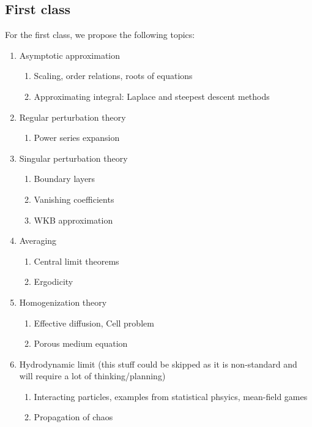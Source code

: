 \documentclass[12pt]{amsart}
\begin{document}
\subsection{First class}
For the first class, we propose the following topics:
\begin{enumerate}
    \item Asymptotic approximation 
        \begin{enumerate}
            \item Scaling, order relations, roots of equations
            \item Approximating integral: Laplace and steepest descent methods
        \end{enumerate}
    \item Regular perturbation theory
        \begin{enumerate}
            \item Power series expansion
        \end{enumerate}
    \item Singular perturbation theory
        \begin{enumerate}
            \item Boundary layers
            \item Vanishing coefficients 
            \item WKB approximation
        \end{enumerate}
    \item Averaging
        \begin{enumerate}
            \item Central limit theorems
            \item Ergodicity
        \end{enumerate}
    \item Homogenization theory
        \begin{enumerate}
            \item Effective diffusion, Cell problem
            \item Porous medium equation
        \end{enumerate}
\item Hydrodynamic limit 
    (this stuff could be skipped as it is 
    non-standard and will require a lot of thinking/planning)
        \begin{enumerate}
            \item Interacting particles, examples from statistical phsyics, mean-field games
            \item Propagation of chaos
        \end{enumerate}
\end{enumerate}
\end{document}
